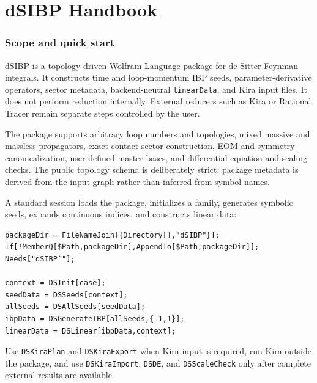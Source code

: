 ﻿\documentclass[a4paper,11pt]{article}
\begin{document}
\clearpage
\part*{dSIBP Handbook}
\setcounter{section}{0}
\renewcommand{\thesection}{\arabic{section}}

\section{Scope and quick start}

dSIBP is a topology-driven Wolfram Language package for de Sitter Feynman integrals.
It constructs time and loop-momentum IBP seeds, parameter-derivative operators, sector
metadata, backend-neutral \texttt{linearData}, and Kira input files. It does not perform
reduction internally. External reducers such as Kira or Rational Tracer remain separate
steps controlled by the user.

The package supports arbitrary loop numbers and topologies, mixed massive and massless
propagators, exact contact-sector construction, EOM and symmetry canonicalization,
user-defined master bases, and differential-equation and scaling checks. The public
topology schema is deliberately strict: package metadata is derived from the input
graph rather than inferred from symbol names.

A standard session loads the package, initializes a family, generates symbolic seeds,
expands continuous indices, and constructs linear data:
\begin{verbatim}
packageDir = FileNameJoin[{Directory[],"dSIBP"}];
If[!MemberQ[$Path,packageDir],AppendTo[$Path,packageDir]];
Needs["dSIBP`"];

context = DSInit[case];
seedData = DSSeeds[context];
allSeeds = DSAllSeeds[seedData];
ibpData = DSGenerateIBP[allSeeds,{-1,1}];
linearData = DSLinear[ibpData,context];
\end{verbatim}
Use \texttt{DSKiraPlan} and \texttt{DSKiraExport} when Kira input is required, run Kira
outside the package, and use \texttt{DSKiraImport}, \texttt{DSDE}, and
\texttt{DSScaleCheck} only after complete external results are available.
\end{document}
